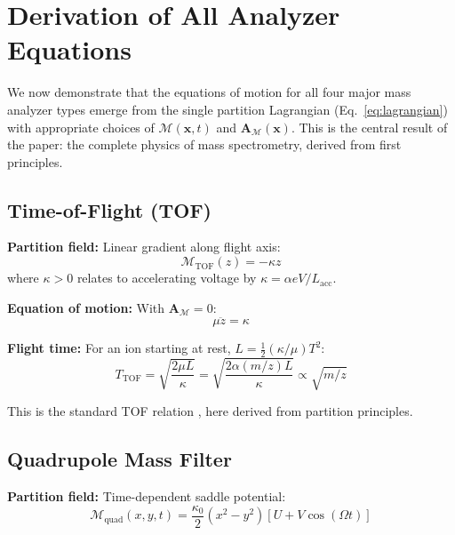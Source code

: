 \documentclass[twocolumn,10pt,a4paper]{article}
\theoremstyle{definition}
\theoremstyle{remark}
\newcommand{\Depth}{\mathcal{M}}
\newcommand{\Apartition}{\mathbf{A}_{\mathcal{M}}}
\newcommand{\partinert}{\mu}
\begin{document}
\section{Derivation of All Analyzer Equations}
\label{sec:analyzers}

We now demonstrate that the equations of motion for all four major mass analyzer types emerge from the single partition Lagrangian (Eq.~\ref{eq:lagrangian}) with appropriate choices of $\Depth(\mathbf{x}, t)$ and $\Apartition(\mathbf{x})$. This is the central result of the paper: the complete physics of mass spectrometry, derived from first principles.

\subsection{Time-of-Flight (TOF)}

\textbf{Partition field:} Linear gradient along flight axis:
\begin{equation}
    \Depth_{\text{TOF}}(z) = -\kappa z
\end{equation}
where $\kappa > 0$ relates to accelerating voltage by $\kappa = \alpha eV/L_{\text{acc}}$.

\textbf{Equation of motion:} With $\Apartition = 0$:
\begin{equation}
    \partinert\ddot{z} = \kappa
\end{equation}

\textbf{Flight time:} For an ion starting at rest, $L = \frac{1}{2}(\kappa/\partinert)T^2$:
\begin{equation}
    \boxed{T_{\text{TOF}} = \sqrt{\frac{2\partinert L}{\kappa}} = \sqrt{\frac{2\alpha(m/z)L}{\kappa}} \propto \sqrt{m/z}}
\end{equation}

This is the standard TOF relation \citep{wiley1955}, here derived from partition principles.

\subsection{Quadrupole Mass Filter}

\textbf{Partition field:} Time-dependent saddle potential:
\begin{equation}
    \Depth_{\text{quad}}(x, y, t) = \frac{\kappa_0}{2}(x^2 - y^2)[U + V\cos(\Omega t)]
\end{equation}
\end{document}
